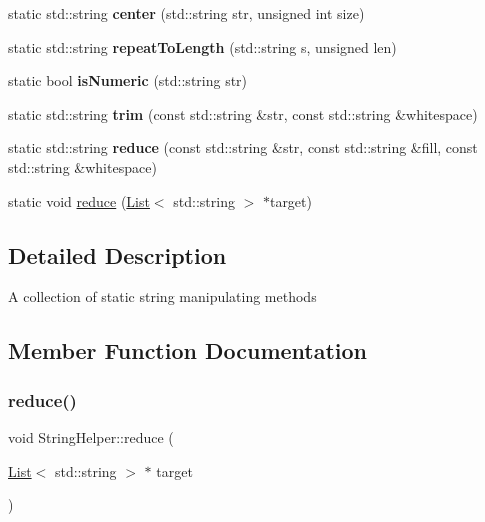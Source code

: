 \begin{DoxyCompactItemize}
\item 
\mbox{\label{class_string_helper_a1d98588e26b828df2517f665bfc55f24}} 
static std\+::string {\bfseries center} (std\+::string str, unsigned int size)
\item 
\mbox{\label{class_string_helper_ad0fad5581fdc7ea0e814cbfa80f84aa0}} 
static std\+::string {\bfseries repeat\+To\+Length} (std\+::string s, unsigned len)
\item 
\mbox{\label{class_string_helper_a2d5dae6a73df6092671c54072a538cee}} 
static bool {\bfseries is\+Numeric} (std\+::string str)
\item 
\mbox{\label{class_string_helper_ad87f85bacfe9605a5fd7da9161a555e8}} 
static std\+::string {\bfseries trim} (const std\+::string \&str, const std\+::string \&whitespace)
\item 
\mbox{\label{class_string_helper_a3b561ed8e0616817bd26fc7b1e48eb6b}} 
static std\+::string {\bfseries reduce} (const std\+::string \&str, const std\+::string \&fill, const std\+::string \&whitespace)
\item 
static void \hyperlink{class_string_helper_a4ac3ae3887b272060af7a77b0751903a}{reduce} (\hyperlink{class_list}{List}$<$ std\+::string $>$ $\ast$target)
\end{DoxyCompactItemize}


\subsection{Detailed Description}
A collection of static string manipulating methods 

\subsection{Member Function Documentation}
\mbox{\label{class_string_helper_a4ac3ae3887b272060af7a77b0751903a}} 
\subsubsection{\texorpdfstring{reduce()}{reduce()}}
{\footnotesize\ttfamily void String\+Helper\+::reduce (\begin{DoxyParamCaption}\item[{\hyperlink{class_list}{List}$<$ std\+::string $>$ $\ast$}]{target }\end{DoxyParamCaption})\hspace{0.3cm}{\ttfamily [static]}}

